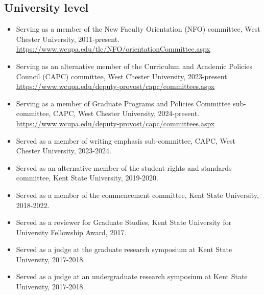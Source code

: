 \documentclass{article}
\begin{document}
\subsection*{University level}\vspace{-0.5em}
\begin{itemize}
\setlength\itemsep{-0.4em}
    \item Serving as a member of the New Faculty Orientation (NFO) committee, West Chester University, 2011-present. \url{https://www.wcupa.edu/tlc/NFO/orientationCommittee.aspx}
    \item Serving as an alternative member of the Curriculum and Academic Policies Council (CAPC) committee, West Chester University, 2023-present. \url{https://www.wcupa.edu/deputy-provost/capc/committees.aspx}
    \item Serving as a member of Graduate Programs and Policies Committee sub-committee, CAPC, West Chester University, 2024-present. \url{https://www.wcupa.edu/deputy-provost/capc/committees.aspx}
    \item Served as a member of writing emphasis sub-committee, CAPC, West Chester University, 2023-2024.
    \item Served as an alternative member of the student rights and standards committee, Kent State University, 2019-2020.
    \item Served as a member of the commencement committee, Kent State University, 2018-2022.
    \item Served as a reviewer for Graduate Studies, Kent State University for University Fellowship Award, 2017.
    \item Served as a judge at the graduate research symposium at Kent State University, 2017-2018. 
    \item Served as a judge at an undergraduate research symposium at Kent State University, 2017-2018.
\end{itemize}
\end{document}
